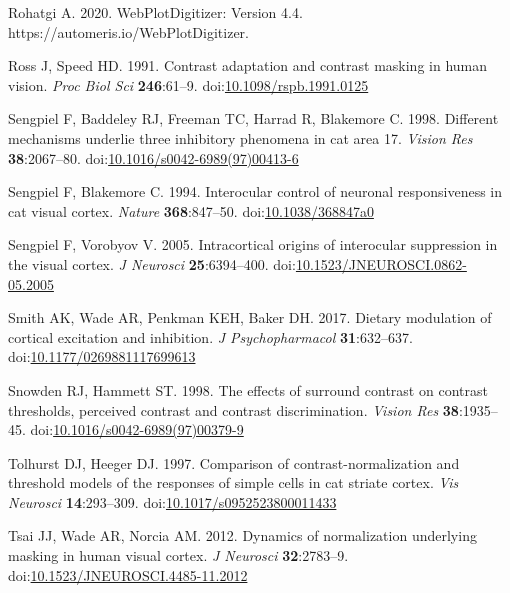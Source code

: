 \documentclass[]{article}
\begin{document}
\leavevmode\hypertarget{ref-Rohatgi2020}{}%
Rohatgi A. 2020. WebPlotDigitizer: Version 4.4. https://automeris.io/WebPlotDigitizer.

\leavevmode\hypertarget{ref-Ross1991}{}%
Ross J, Speed HD. 1991. Contrast adaptation and contrast masking in human vision. \emph{Proc Biol Sci} \textbf{246}:61--9. doi:\href{https://doi.org/10.1098/rspb.1991.0125}{10.1098/rspb.1991.0125}

\leavevmode\hypertarget{ref-Sengpiel1998}{}%
Sengpiel F, Baddeley RJ, Freeman TC, Harrad R, Blakemore C. 1998. Different mechanisms underlie three inhibitory phenomena in cat area 17. \emph{Vision Res} \textbf{38}:2067--80. doi:\href{https://doi.org/10.1016/s0042-6989(97)00413-6}{10.1016/s0042-6989(97)00413-6}

\leavevmode\hypertarget{ref-Sengpiel1994}{}%
Sengpiel F, Blakemore C. 1994. Interocular control of neuronal responsiveness in cat visual cortex. \emph{Nature} \textbf{368}:847--50. doi:\href{https://doi.org/10.1038/368847a0}{10.1038/368847a0}

\leavevmode\hypertarget{ref-Sengpiel2005}{}%
Sengpiel F, Vorobyov V. 2005. Intracortical origins of interocular suppression in the visual cortex. \emph{J Neurosci} \textbf{25}:6394--400. doi:\href{https://doi.org/10.1523/JNEUROSCI.0862-05.2005}{10.1523/JNEUROSCI.0862-05.2005}

\leavevmode\hypertarget{ref-Smith2017}{}%
Smith AK, Wade AR, Penkman KEH, Baker DH. 2017. Dietary modulation of cortical excitation and inhibition. \emph{J Psychopharmacol} \textbf{31}:632--637. doi:\href{https://doi.org/10.1177/0269881117699613}{10.1177/0269881117699613}

\leavevmode\hypertarget{ref-Snowden1998}{}%
Snowden RJ, Hammett ST. 1998. The effects of surround contrast on contrast thresholds, perceived contrast and contrast discrimination. \emph{Vision Res} \textbf{38}:1935--45. doi:\href{https://doi.org/10.1016/s0042-6989(97)00379-9}{10.1016/s0042-6989(97)00379-9}

\leavevmode\hypertarget{ref-Tolhurst1997}{}%
Tolhurst DJ, Heeger DJ. 1997. Comparison of contrast-normalization and threshold models of the responses of simple cells in cat striate cortex. \emph{Vis Neurosci} \textbf{14}:293--309. doi:\href{https://doi.org/10.1017/s0952523800011433}{10.1017/s0952523800011433}

\leavevmode\hypertarget{ref-Tsai2012}{}%
Tsai JJ, Wade AR, Norcia AM. 2012. Dynamics of normalization underlying masking in human visual cortex. \emph{J Neurosci} \textbf{32}:2783--9. doi:\href{https://doi.org/10.1523/JNEUROSCI.4485-11.2012}{10.1523/JNEUROSCI.4485-11.2012}
\end{document}
